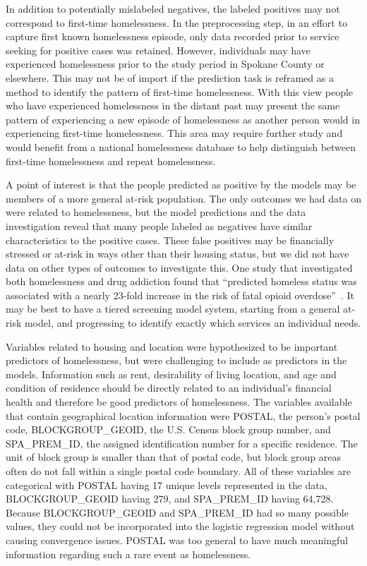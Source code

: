 \documentclass[10pt,letterpaper]{article}
\begin{document}
In addition to potentially mislabeled negatives, the labeled positives may not correspond to first-time homelessness. In the preprocessing step, in an effort to capture first known homelessness episode, only data recorded prior to service seeking for positive cases was retained. However, individuals may have experienced homelessness prior to the study period in Spokane County or elsewhere. This may not be of import if the prediction task is reframed as a method to identify the pattern of first-time homelessness. With this view people who have experienced homelessness in the distant past may present the same pattern of experiencing a new episode of homelessness as another person would in experiencing first-time homelessness. This area may require further study and would benefit from a national homelessness database to help distinguish between first-time homelessness and repeat homelessness.

A point of interest is that the people predicted as positive by the models may be members of a more general at-risk population. The only outcomes we had data on were related to homelessness, but the model predictions and the data investigation reveal that many people labeled as negatives have similar characteristics to the positive cases. These false positives may be financially stressed or at-risk in ways other than their housing status, but we did not have data on other types of outcomes to investigate this. One study that investigated both homelessness and drug addiction found that ``predicted homeless status was associated with a nearly 23-fold increase in the risk of fatal opioid overdose''~\cite{byrne2020classification}. It may be best to have a tiered screening model system, starting from a general at-risk model, and progressing to identify exactly which services an individual needs.

Variables related to housing and location were hypothesized to be important predictors of homelessness, but were challenging to include as predictors in the models. Information such as rent, desirability of living location, and age and condition of residence should be directly related to an individual's financial health and therefore be good predictors of homelessness. The variables available that contain geographical location information were POSTAL, the person's postal code, BLOCKGROUP\_GEOID, the U.S. Census block group number, and SPA\_PREM\_ID, the assigned identification number for a specific residence. The unit of block group is smaller than that of postal code, but block group areas often do not fall within a single postal code boundary. All of these variables are categorical with POSTAL having 17 unique levels represented in the data, BLOCKGROUP\_GEOID having 279, and SPA\_PREM\_ID having 64,728. Because BLOCKGROUP\_GEOID and SPA\_PREM\_ID had so many possible values, they could not be incorporated into the logistic regression model without causing convergence issues. POSTAL was too general to have much meaningful information regarding such a rare event as homelessness. 
\end{document}
